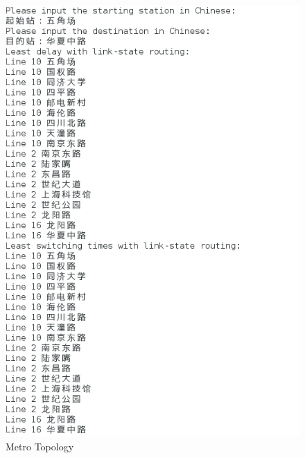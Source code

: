 \documentclass[12pt]{article}
\begin{document}
\begin{figure}[H]
	\begin{center}
		\includegraphics[width=1\textwidth]{figures/3}
	\end{center}
	\caption{Metro Topology}
	\label{1}
\end{figure}
\end{document}
